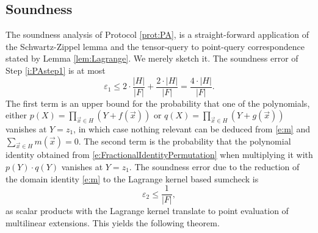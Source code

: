 \documentclass[11pt]{article}
\theoremstyle{definition}
\theoremstyle{remark}
\begin{document}
\subsection{Soundness}
\label{s:PASoundness}

The soundness analysis of Protocol \ref{prot:PA}, is a straight-forward application of the Schwartz-Zippel lemma and the tensor-query to point-query correspondence stated by Lemma \ref{lem:Lagrange}.
We merely sketch it.
The soundness error of Step \ref{i:PAstep1} is at most 
\begin{equation*}
\varepsilon_1 \leq 2\cdot\frac{ |H|}{|F|} + \frac{2\cdot |H|}{|F|} = \frac{4\cdot |H|}{|F|}.
\end{equation*}
The first term is an upper bound for the probability that one of the polynomials, either
$p(X)=\prod_{\vec x\in H} (Y + f(\vec x))$ 
or 
$q(X)= \prod_{\vec x\in H} (Y + g(\vec x))$ 
vanishes at $Y=z_1$, in which case nothing relevant can be deduced from \eqref{e:m} and $\sum_{\vec x\in H} m(\vec x)=0$.
The second term is the probability that the polynomial identity obtained from \eqref{e:FractionalIdentityPermutation} when multiplying it with $p(Y)\cdot q(Y)$ vanishes at $Y = z_1$.
The soundness error due to the reduction of the domain identity  \eqref{e:m}  to the Lagrange kernel based sumcheck is 
\[
\varepsilon_2 \leq \frac{1}{|F|},
\]
as scalar products with the Lagrange kernel translate to point evaluation of multilinear extensions.
This yields the following theorem. 
\end{document}
